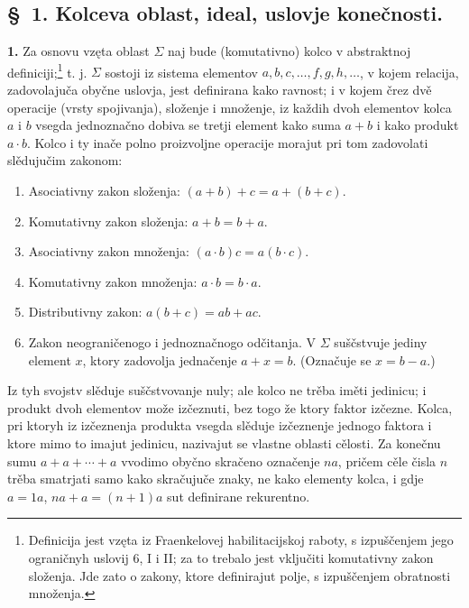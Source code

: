 \documentclass[11pt]{article}
\begin{document}

\setcounter{footnote}{5}
\subsection*{\S~1. Kolceva oblast, ideal, uslovje konečnosti.}

\textbf{1.} Za osnovu vzęta oblast \(\Sigma\) naj bude (komutativno) kolco v abstraktnoj definiciji;\footnote{Definicija jest vzęta iz Fraenkelovej habilitacijskoj raboty, s izpuščenjem jego ograničnyh uslovij 6, I i II; za to trebalo jest vključiti komutativny zakon složenja. Jde zato o zakony, ktore definirajut polje, s izpuščenjem obratnosti množenja.} t. j. \(\Sigma\) sostoji iz sistema elementov \(a,b,c,\ldots,f,g,h,\ldots\), v kojem relacija, zadovolajuča obyčne uslovja, jest definirana kako ravnost; i v kojem črez dvě operacije (vrsty spojivanja), složenje i množenje, iz každih dvoh elementov kolca \(a\) i \(b\) vsegda jednoznačno dobiva se tretji element kako suma \(a+b\) i kako produkt \(a\cdot b\). Kolco i ty inače polno proizvoljne operacije morajut pri tom zadovolati slědujučim zakonom:
\begin{enumerate}
\item Asociativny zakon složenja: \((a+b)+c=a+(b+c)\).
\item Komutativny zakon složenja: \(a+b=b+a\).
\item Asociativny zakon množenja: \((a\cdot b)c=a(b\cdot c)\).
\item Komutativny zakon množenja: \(a\cdot b=b\cdot a\).
\item Distributivny zakon: \(a(b+c)=ab+ac\).
\item Zakon neograničenogo i jednoznačnogo odčitanja. V \(\Sigma\) suščstvuje jediny element \(x\), ktory zadovolja jednačenje \(a+x=b\). (Označuje se \(x=b-a\).)
\end{enumerate}
Iz tyh svojstv slěduje suščstvovanje nuly; ale kolco ne trěba iměti jedinicu; i produkt dvoh elementov može izčeznuti, bez togo že ktory faktor izčezne. Kolca, pri ktoryh iz izčeznenja produkta vsegda slěduje izčeznenje jednogo faktora i ktore mimo to imajut jedinicu, nazivajut se vlastne oblasti cělosti. Za konečnu sumu \(a+a+\cdots+a\) vvodimo obyčno skračeno označenje \(na\), pričem cěle čisla \(n\) trěba smatrjati samo kako skračujuče znaky, ne kako elementy kolca, i gdje \(a=1a\), \(na+a=(n+1)a\) sut definirane rekurentno.
\end{document}
